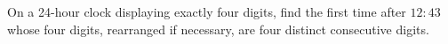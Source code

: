 On a 24-hour clock displaying exactly four digits, find the first time after $12:43$ whose four digits, rearranged if necessary, are four distinct consecutive digits.
